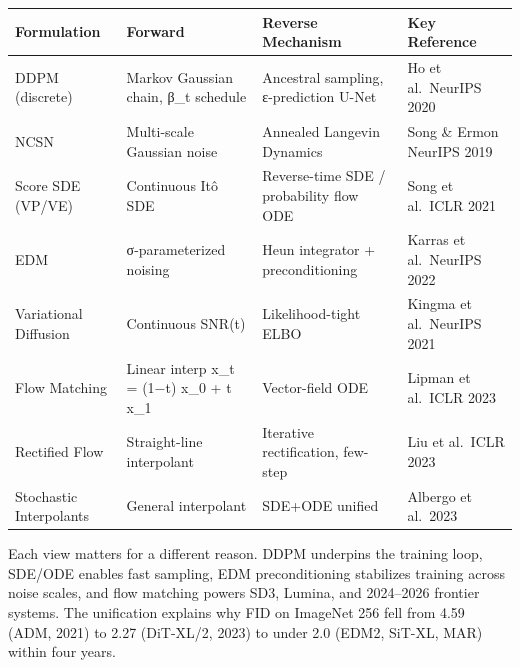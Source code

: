 {\def\LTcaptype{none} %
\begin{longtable}[]{@{}
  >{\raggedright\arraybackslash}p{}
  >{\raggedright\arraybackslash}p{}
  >{\raggedright\arraybackslash}p{}
  >{\raggedright\arraybackslash}p{}@{}}
\toprule\noalign{}
\begin{minipage}[b]{\linewidth}\raggedright
Formulation
\end{minipage} & \begin{minipage}[b]{\linewidth}\raggedright
Forward
\end{minipage} & \begin{minipage}[b]{\linewidth}\raggedright
Reverse Mechanism
\end{minipage} & \begin{minipage}[b]{\linewidth}\raggedright
Key Reference
\end{minipage} \\
\midrule\noalign{}
\endhead
\bottomrule\noalign{}
\endlastfoot
DDPM (discrete) & Markov Gaussian chain, β\_t schedule & Ancestral sampling, ε-prediction U-Net & Ho et al.~NeurIPS 2020 \\
NCSN & Multi-scale Gaussian noise & Annealed Langevin Dynamics & Song \& Ermon NeurIPS 2019 \\
Score SDE (VP/VE) & Continuous Itô SDE & Reverse-time SDE / probability flow ODE & Song et al.~ICLR 2021 \\
EDM & σ-parameterized noising & Heun integrator + preconditioning & Karras et al.~NeurIPS 2022 \\
Variational Diffusion & Continuous SNR(t) & Likelihood-tight ELBO & Kingma et al.~NeurIPS 2021 \\
Flow Matching & Linear interp x\_t = (1−t) x\_0 + t x\_1 & Vector-field ODE & Lipman et al.~ICLR 2023 \\
Rectified Flow & Straight-line interpolant & Iterative rectification, few-step & Liu et al.~ICLR 2023 \\
Stochastic Interpolants & General interpolant & SDE+ODE unified & Albergo et al.~2023 \\
\end{longtable}
}

Each view matters for a different reason. DDPM underpins the training loop, SDE/ODE enables fast sampling, EDM preconditioning stabilizes training across noise scales, and flow matching powers SD3, Lumina, and 2024--2026 frontier systems. The unification explains why FID on ImageNet 256 fell from 4.59 (ADM, 2021) to 2.27 (DiT-XL/2, 2023) to under 2.0 (EDM2, SiT-XL, MAR) within four years.

